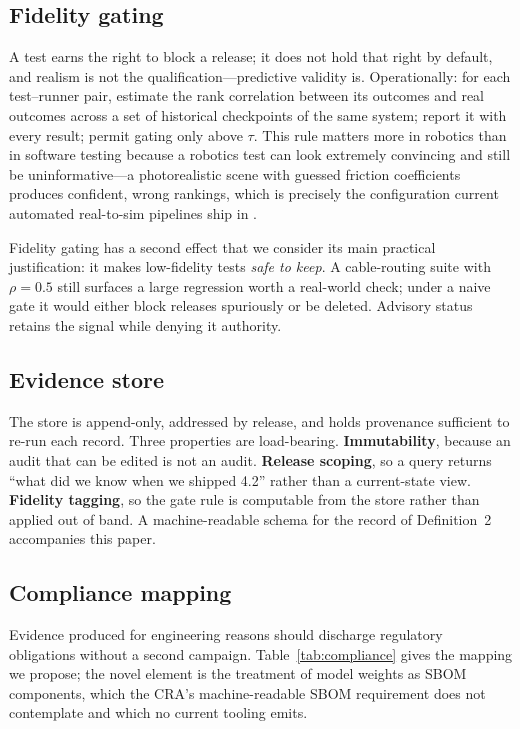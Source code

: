 \documentclass[11pt]{article}
\theoremstyle{definition}
\newcommand{\term}[1]{\emph{#1}}
\begin{document}
\subsection{Fidelity gating}
\label{sec:gating}

A test earns the right to block a release; it does not hold that right by default, and
realism is not the qualification---predictive validity is. Operationally: for each
test--runner pair, estimate the rank correlation between its outcomes and real outcomes
across a set of historical checkpoints of the same system; report it with every result;
permit gating only above $\tau$. This rule matters more in robotics than in software testing
because a robotics test can look extremely convincing and still be uninformative---a
photorealistic scene with guessed friction coefficients produces confident, wrong rankings,
which is precisely the configuration current automated real-to-sim pipelines ship in
\citep{simfoundry,robosnap,scanmatsim}.

Fidelity gating has a second effect that we consider its main practical justification: it
makes low-fidelity tests \term{safe to keep}. A cable-routing suite with $\rho = 0.5$ still
surfaces a large regression worth a real-world check; under a naive gate it would either
block releases spuriously or be deleted. Advisory status retains the signal while denying it
authority.

\subsection{Evidence store}
\label{sec:store}

The store is append-only, addressed by release, and holds provenance sufficient to re-run
each record. Three properties are load-bearing. \textbf{Immutability}, because an audit that
can be edited is not an audit. \textbf{Release scoping}, so a query returns ``what did we
know when we shipped 4.2'' rather than a current-state view. \textbf{Fidelity tagging}, so
the gate rule is computable from the store rather than applied out of band. A machine-readable
schema for the record of Definition~2 accompanies this paper.

\subsection{Compliance mapping}
\label{sec:compliance}

Evidence produced for engineering reasons should discharge regulatory obligations without a
second campaign. Table~\ref{tab:compliance} gives the mapping we propose; the novel element
is the treatment of model weights as SBOM components, which the CRA's machine-readable SBOM
requirement \citep{cra} does not contemplate and which no current tooling emits.
\end{document}
